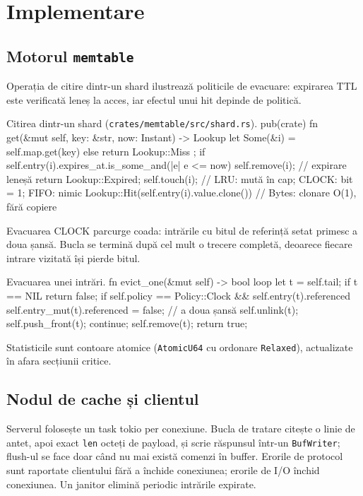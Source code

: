 \chapter{Implementare}
\label{ch:implementare}

\section{Motorul \texttt{memtable}}

Operația de citire dintr-un shard ilustrează politicile de evacuare: expirarea TTL este verificată leneș
la acces, iar efectul unui hit depinde de politică.

\begin{code}{Citirea dintr-un shard (\texttt{crates/memtable/src/shard.rs}).}
pub(crate) fn get(&mut self, key: &str, now: Instant) -> Lookup {
    let Some(&i) = self.map.get(key) else { return Lookup::Miss };
    if self.entry(i).expires_at.is_some_and(|e| e <= now) {
        self.remove(i);              // expirare leneșă
        return Lookup::Expired;
    }
    self.touch(i);                   // LRU: mută în cap; CLOCK: bit = 1; FIFO: nimic
    Lookup::Hit(self.entry(i).value.clone())   // Bytes: clonare O(1), fără copiere
}
\end{code}

Evacuarea CLOCK parcurge coada: intrările cu bitul de referință setat primesc a doua șansă. Bucla se
termină după cel mult o trecere completă, deoarece fiecare intrare vizitată își pierde bitul.

\begin{code}{Evacuarea unei intrări.}
fn evict_one(&mut self) -> bool {
    loop {
        let t = self.tail;
        if t == NIL { return false; }
        if self.policy == Policy::Clock && self.entry(t).referenced {
            self.entry_mut(t).referenced = false;   // a doua șansă
            self.unlink(t);
            self.push_front(t);
            continue;
        }
        self.remove(t);
        return true;
    }
}
\end{code}

Statisticile sunt contoare atomice (\texttt{AtomicU64} cu ordonare \texttt{Relaxed}), actualizate în
afara secțiunii critice.

\section{Nodul de cache și clientul}

Serverul folosește un task tokio per conexiune. Bucla de tratare citește o linie de antet, apoi exact
\texttt{len} octeți de payload, și scrie răspunsul într-un \texttt{BufWriter}; flush-ul se face doar
când nu mai există comenzi în buffer. Erorile de protocol sunt raportate clientului fără a închide
conexiunea; erorile de I/O închid conexiunea. Un janitor elimină periodic intrările expirate.

